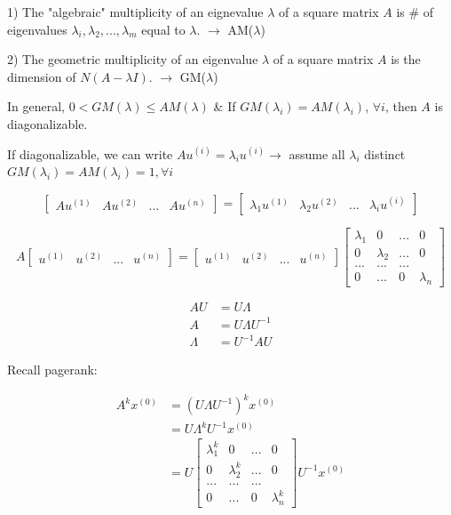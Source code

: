 1) The "algebraic" multiplicity of an eignevalue $\lambda$ of a square matrix $A$ is \# of eigenvalues $\lambda_i, \lambda_2,...,\lambda_m$ equal to $\lambda$. $\rightarrow$ AM($\lambda$)

2) The geometric multiplicity of an eigenvalue $\lambda$ of a square matrix $A$ is the dimension of $N(A - \lambda I)$. $\rightarrow$ GM($\lambda$)

In general, $0 < GM(\lambda) \leq AM(\lambda)$ \& If $GM(\lambda_i) = AM(\lambda_i)$, $\forall i$, then $A$ is diagonalizable. 


If diagonalizable, we can write $Au^{(i)} = \lambda_iu^{(i)} \rightarrow$ assume all $\lambda_i$ distinct $GM(\lambda_i) = AM(\lambda_i) = 1, \forall i$

$$
\left[
\begin{matrix}
Au^{(1)} & Au^{(2)} &... &Au^{(n)} 
\end{matrix}
\right] =
\left[
\begin{matrix}
\lambda_1u^{(1)} & \lambda_2u^{(2)}&... &\lambda_iu^{(i)}
\end{matrix}
\right]
$$

$$A
\left[
\begin{matrix}
u^{(1)} & u^{(2)} &... &u^{(n)} 
\end{matrix}
\right] =
\left[
\begin{matrix}
u^{(1)} & u^{(2)} &... &u^{(n)}
\end{matrix}
\right]
\left[
\begin{matrix}
\lambda_1 & 0 & ... & 0\\
0& \lambda_2  &  ... & 0\\
...  & ...  &   ...& \\
0    &  ... &  0 & \lambda_n
\end{matrix}
\right]
$$



\begin{align*}
AU &= U\Lambda\\
A &= U\Lambda U^{-1}\\
\Lambda &= U^{-1}AU
\end{align*}

Recall pagerank:

\begin{align*}
A^kx^{(0)} &= (U\Lambda U^{-1})^kx^{(0)}\\
&=U\Lambda^kU^{-1}x^{(0)} \\
&= U
\begin{bmatrix}
\lambda_1^k & 0 & ... & 0\\
0& \lambda_2^k  &  ... & 0\\
...  & ...  &   ...& \\
0    &  ... &  0 & \lambda_n^k
\end{bmatrix} U^{-1}x^{(0)}
\end{align*}

